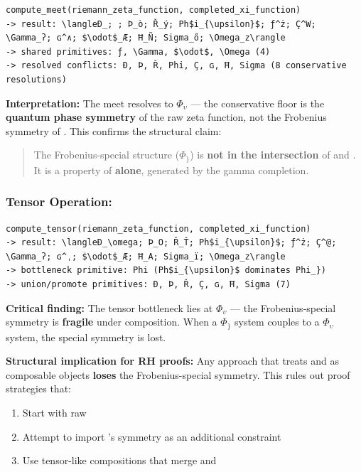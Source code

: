 \documentclass[12pt,a4paper]{article}
\begin{document}
\begin{lstlisting}
compute_meet(riemann_zeta_function, completed_xi_function)
-> result: \langleÐ_; ; Þ_ò; Ř_ý; Ph$i_{\upsilon}$; ƒ^ż; Ç^W; \Gamma_ʔ; ɢ^∧; $\odot$_Æ; Ħ_Ñ; Sigma_ő; \Omega_z\rangle
-> shared primitives: ƒ, \Gamma, $\odot$, \Omega (4)
-> resolved conflicts: Ð, Þ, Ř, Phi, Ç, ɢ, Ħ, Sigma (8 conservative resolutions)
\end{lstlisting}

\textbf{Interpretation:} The meet resolves to $\Phi_{\upsilon}$ --- the conservative floor is the \textbf{quantum phase symmetry} of the raw zeta function, not the Frobenius symmetry of \xi. This confirms the structural claim:

\begin{quote}
The Frobenius-special structure ($\Phi_{\}}$) is \textbf{not in the intersection} of \zeta and \xi. It is a property of \xi \textbf{alone}, generated by the gamma completion.

\end{quote}

\subsubsection{Tensor Operation: \zeta \otimes \xi}

\begin{lstlisting}
compute_tensor(riemann_zeta_function, completed_xi_function)
-> result: \langleÐ_\omega; Þ_O; Ř_Ť; Ph$i_{\upsilon}$; ƒ^ż; Ç^@; \Gamma_ʔ; ɢ^ˌ; $\odot$_Æ; Ħ_A; Sigma_ï; \Omega_z\rangle
-> bottleneck primitive: Phi (Ph$i_{\upsilon}$ dominates Phi_})
-> union/promote primitives: Ð, Þ, Ř, Ç, ɢ, Ħ, Sigma (7)
\end{lstlisting}

\textbf{Critical finding:} The tensor bottleneck lies at $\Phi_{\upsilon}$ --- the Frobenius-special symmetry is \textbf{fragile} under composition. When a $\Phi_{\}}$ system couples to a $\Phi_{\upsilon}$ system, the special symmetry is lost.

\textbf{Structural implication for RH proofs:} Any approach that treats \zeta and \xi as composable objects \textbf{loses} the Frobenius-special symmetry. This rules out proof strategies that:

\begin{enumerate}
    \item Start with raw \zeta
    \item Attempt to import \xi's symmetry as an additional constraint
    \item Use tensor-like compositions that merge \zeta and \xi
\end{enumerate}
\end{document}
